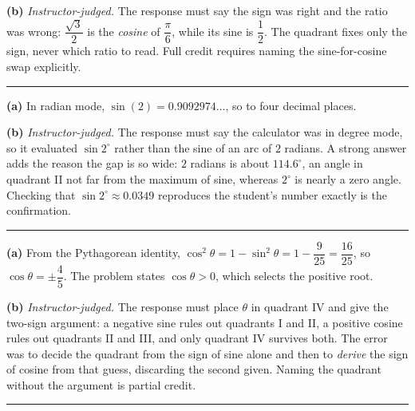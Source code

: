 \documentclass[12pt]{article}
\begin{document}
\textbf{(b)} \emph{Instructor-judged.} The response must say the sign was right and the ratio was wrong: $\dfrac{\sqrt{3}}{2}$ is the \emph{cosine} of $\dfrac{\pi}{6}$, while its sine is $\dfrac{1}{2}$. The quadrant fixes only the sign, never which ratio to read. Full credit requires naming the sine-for-cosine swap explicitly.

\vspace{0.15cm}\noindent\rule{\linewidth}{0.2pt}\vspace{0.15cm}


\textbf{(a)} In radian mode, $\sin(2) = 0.9092974\ldots$, so to four decimal places. 

\textbf{(b)} \emph{Instructor-judged.} The response must say the calculator was in degree mode, so it evaluated $\sin 2^\circ$ rather than the sine of an arc of $2$ radians. A strong answer adds the reason the gap is so wide: $2$ radians is about $114.6^\circ$, an angle in quadrant II not far from the maximum of sine, whereas $2^\circ$ is nearly a zero angle. Checking that $\sin 2^\circ \approx 0.0349$ reproduces the student's number exactly is the confirmation.

\vspace{0.15cm}\noindent\rule{\linewidth}{0.2pt}\vspace{0.15cm}


\textbf{(a)} From the Pythagorean identity, $\cos^2\theta = 1 - \sin^2\theta = 1 - \dfrac{9}{25} = \dfrac{16}{25}$, so $\cos\theta = \pm\dfrac{4}{5}$. The problem states $\cos\theta > 0$, which selects the positive root. 

\textbf{(b)} \emph{Instructor-judged.} The response must place $\theta$ in quadrant IV and give the two-sign argument: a negative sine rules out quadrants I and II, a positive cosine rules out quadrants II and III, and only quadrant IV survives both. The error was to decide the quadrant from the sign of sine alone and then to \emph{derive} the sign of cosine from that guess, discarding the second given. Naming the quadrant without the argument is partial credit.

\vspace{0.15cm}\noindent\rule{\linewidth}{0.2pt}\vspace{0.15cm}
\end{document}
